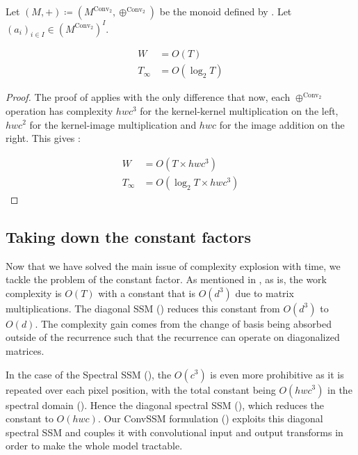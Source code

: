 \documentclass{article}
\begin{document}
\begin{proposition}
    Let $(M, +) \coloneqq (M^{\mathrm{Conv}_2}, \oplus^{\mathrm{Conv}_2})$ be the monoid defined by . Let $(a_i)_{i\in I}\in (M^{\mathrm{Conv}_2})^I$.

\begin{align}
    W&= O(T)\\
    T_\infty&= O(\log_2T)
\end{align}
\end{proposition}

\begin{proof}
The proof of  applies with the only difference that now, each $\oplus^{\mathrm{Conv}_2}$ operation has complexity $h w c^3$ for the kernel-kernel multiplication on the left, $h w c^2$ for the kernel-image multiplication and $h w c$ for the image addition on the right. This gives :

\begin{align}
\label{eq:W_spectral}
    W&= O(T \times h w c^3)\\
\label{eq:T_spectral}
    T_\infty&= O(\log_2T \times h w c^3)
\end{align}
\end{proof}

\subsection{Taking down the constant factors}
\label{app:constant_factors}

Now that we have solved the main issue of complexity explosion with time, we tackle the problem of the constant factor. As mentioned in , as is, the work complexity is $O(T)$ with a constant that is $O(d^3)$ due to matrix multiplications.
%
The diagonal SSM () reduces this constant from $O(d^3)$ to $O(d)$. The complexity gain comes from the change of basis being absorbed outside of the recurrence such that the recurrence can operate on diagonalized matrices.

In the case of the Spectral SSM (), the $O(c^3)$ is even more prohibitive as it is repeated over each pixel position, with the total constant being $O(hwc^3)$ in the spectral domain (). Hence the diagonal spectral SSM (), which reduces the constant to $O(hwc)$. Our ConvSSM formulation () exploits this diagonal spectral SSM and couples it with convolutional input and output transforms in order to make the whole model tractable.
\end{document}
